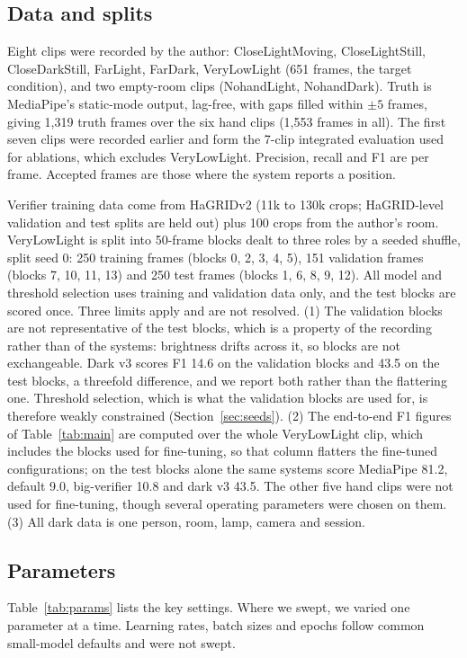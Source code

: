 \documentclass[conference,a4paper]{IEEEtran}
\begin{document}
\subsection{Data and splits}
Eight clips were recorded by the author: CloseLightMoving, CloseLightStill,
CloseDarkStill, FarLight, FarDark, VeryLowLight (651 frames, the target
condition), and two empty-room clips (NohandLight, NohandDark). Truth is
MediaPipe's static-mode output, lag-free, with gaps filled within $\pm5$
frames, giving 1,319 truth frames over the six hand clips (1,553 frames in
all). The first seven clips were recorded earlier and form the 7-clip
integrated evaluation used for ablations, which excludes VeryLowLight.
Precision, recall and F1 are per frame. Accepted frames are those where the
system reports a position.

Verifier training data come from HaGRIDv2 (11k to 130k crops; HaGRID-level
validation and test splits are held out) plus 100 crops from the author's
room. VeryLowLight is split into 50-frame blocks dealt to three roles by a
seeded shuffle, split seed 0: 250 training frames (blocks 0, 2, 3, 4, 5),
151 validation frames (blocks 7, 10, 11, 13) and 250 test frames (blocks 1,
6, 8, 9, 12). All model and threshold selection uses training and
validation data only, and the test blocks are scored once. Three limits
apply and are not resolved. (1) The validation blocks are not
representative of the test blocks, which is a property of the recording
rather than of the systems: brightness drifts across it, so blocks are not
exchangeable. Dark v3 scores F1 14.6 on the validation blocks and 43.5 on
the test blocks, a threefold difference, and we report both rather than the
flattering one. Threshold selection, which is what the validation blocks
are used for, is therefore weakly constrained (Section~\ref{sec:seeds}).
(2) The end-to-end F1 figures of Table~\ref{tab:main} are computed over the
whole VeryLowLight clip, which includes the blocks used for fine-tuning, so
that column flatters the fine-tuned configurations; on the test blocks
alone the same systems score MediaPipe 81.2, default 9.0, big-verifier 10.8
and dark v3 43.5. The other five hand clips were not used for fine-tuning,
though several operating parameters were chosen on them. (3) All dark data
is one person, room, lamp, camera and session.

\subsection{Parameters}
Table~\ref{tab:params} lists the key settings. Where we swept, we varied
one parameter at a time. Learning rates, batch sizes and epochs follow
common small-model defaults and were not swept.
\end{document}
